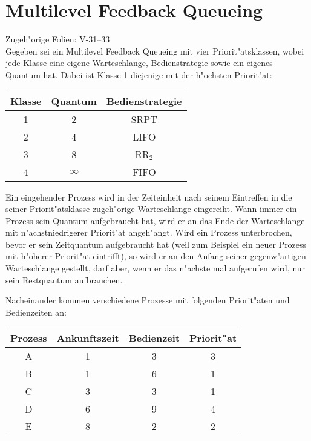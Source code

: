 \section{Multilevel Feedback Queueing}

Zugeh"orige Folien:  V-31--33 \\

Gegeben sei ein Multilevel Feedback Queueing mit vier
Priorit"atsklassen, wobei jede Klasse eine eigene Warteschlange,
Bedienstrategie sowie ein eigenes Quantum hat.  Dabei ist Klasse 1
diejenige mit der h"ochsten Priorit"at:

\begin{center}
  \begin{tabular}{ccc}
    \toprule
    Klasse & Quantum  & Bedienstrategie \\
    \midrule
    1      & 2        & SRPT \\
    2      & 4        & LIFO \\
    3      & 8        & RR${}_2$ \\
    4      & $\infty$ & FIFO \\
    \bottomrule
  \end{tabular}
\end{center}

Ein eingehender Prozess wird in der Zeiteinheit nach seinem Eintreffen
in die seiner Priorit"atsklasse zugeh"orige Warteschlange eingereiht.
Wann immer ein Prozess sein Quantum aufgebraucht hat, wird er an das
Ende der Warteschlange mit n"achstniedrigerer Priorit"at angeh"angt.
Wird ein Prozess unterbrochen, bevor er sein Zeitquantum aufgebraucht
hat (weil zum Beispiel ein neuer Prozess mit h"oherer Priorit"at
eintrifft), so wird er an den Anfang seiner gegenw"artigen
Warteschlange gestellt, darf aber, wenn er das n"achste mal aufgerufen
wird, nur sein Restquantum aufbrauchen.

Nacheinander kommen verschiedene Prozesse mit folgenden Priorit"aten und
Bedienzeiten an:

\begin{center}
  \begin{tabular}{cccc}
    \toprule
    Prozess & Ankunftszeit & Bedienzeit & Priorit"at \\
    \midrule
    A       & 1            & 3          & 3 \\
    B       & 1            & 6          & 1 \\
    C       & 3            & 3          & 1 \\
    D       & 6            & 9          & 4 \\
    E       & 8            & 2          & 2 \\
    \bottomrule
  \end{tabular}
\end{center}

